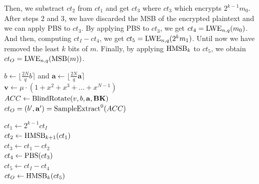 Then, we substract $ct_{2}$ from $ct_{1}$ and get $ct_{3}$ where 
$ct_{3}$ which encrypts $2^{k-1}m_{0}$. After steps 2 and 3, we 
have discarded the MSB of the encrypted plaintext and we can apply 
PBS to $ct_{3}$. By applying PBS to $ct_{3}$, we get $ct_{4} = {\rm LWE}_{n,q}(m_0)$. And then, computing $ct_{I} - ct_{4}$, we get 
$ct_{5} = {\rm LWE}_{n,q}(2^{k}m_1)$. Until now we have removed the 
least $k$ bits of $m$. Finally, by applying ${\rm HMSB}_{k}$ 
to $ct_{5}$, we obtain $ct_{O} = {\rm LWE}_{n,q}({\rm MSB}(m))$.

\begin{algorithm}[t!]
    \caption{The standard $k$-bit homomorphic MSB Extraction}
    \label{algo: kHMSB}
    $b \leftarrow \lfloor \frac{2N}{q}b \rceil$ 
    and $\mathbf{a} \leftarrow \lfloor \frac{2N}{q}\mathbf{a} \rceil$ \\
    $\mathbf{v} \leftarrow \mu \cdot (1 + x^2 + x^3 + ... + x^{N-1}) $ \\
    $ACC \leftarrow {\rm BlindRotate}(v, b, \mathbf{a}, \mathbf{BK})$ \\
    $ct_{O} = (b', \mathbf{a'}) = {\rm SampleExtract}^{0}(ACC)$ \\
\end{algorithm}

\begin{algorithm}[t!]
    \caption{Constructing $2k$-bit MSB Extraction 
            using $(k+1)$-bit MSB Extraction}
    \label{algo: 2kHMSB}
    $ct_{1} \leftarrow 2^{k-1}ct_{I}$  \\
    $ct_{2} \leftarrow {\rm HMSB}_{k+1}(ct_{1}) $ 
     \\
    $ct_{3} \leftarrow ct_{1} - ct_{2}$ 
     \\
    $ct_{4} \leftarrow {\rm PBS}(ct_{3})$ 
     \\
    $ct_{5} \leftarrow ct_{I} - ct_{4}$ 
     \\
    $ct_{O} \leftarrow {\rm HMSB}_{k}(ct_{5})$
     \\
\end{algorithm}


